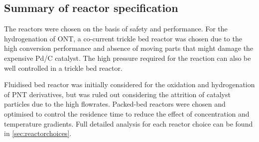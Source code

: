 \subsection{Summary of reactor specification}
\begin{table}[]
\centering
\caption{Summary of non-detailed reactors}
\label{tab:nondetailedtable}
\end{table}

The reactors were chosen on the basis of safety and performance. For the hydrogenation of ONT, a co-current trickle bed reactor was chosen due to the high conversion performance and absence of moving parts that might damage the expensive Pd/C catalyst. The high pressure required for the reaction can also be well controlled in a trickle bed reactor. 

Fluidised bed reactor was initially considered for the oxidation and hydrogenation of PNT derivatives, but was ruled out considering the attrition of catalyst particles due to the high flowrates. Packed-bed reactors were chosen and optimised to control the residence time to reduce the effect of concentration and temperature gradients. Full detailed analysis for each reactor choice can be found in \ref{sec:reactorchoices}.
